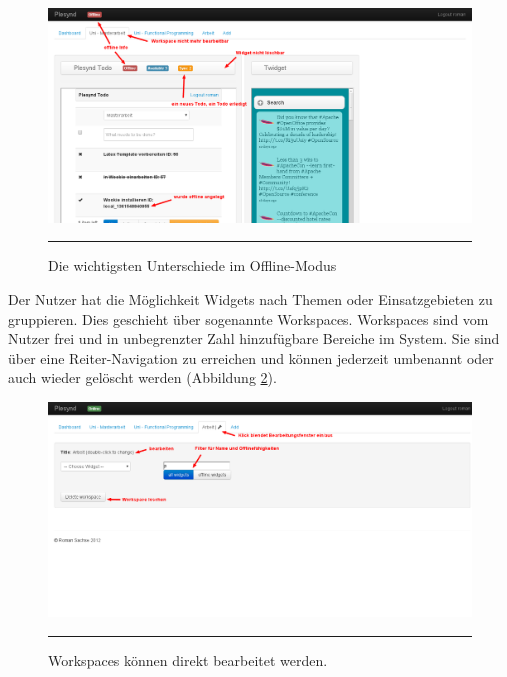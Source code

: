 \begin{figure}
  \centering
  \includegraphics[width=\textwidth,height=\textheight,keepaspectratio]{./Figures/plesynd_workspace_offline.png}
    \rule{35em}{0.5pt}
  \caption[Plesynd User-Interface: Workspace Offline]{Die wichtigsten Unterschiede im Offline-Modus}
  \label{fig:plesynd_workspace_offline}
\end{figure}
Der Nutzer hat die Möglichkeit Widgets nach Themen oder Einsatzgebieten zu gruppieren. Dies geschieht über sogenannte Workspaces. Workspaces sind vom Nutzer frei und in unbegrenzter Zahl hinzufügbare Bereiche im System. Sie sind über eine Reiter-Navigation zu erreichen und können jederzeit umbenannt oder auch wieder gelöscht werden (Abbildung \ref{fig:plesynd_workspace_edit}). 
\begin{figure}
  \centering
  \includegraphics[width=\textwidth,height=\textheight,keepaspectratio]{./Figures/plesynd_workspace_edit.png}
    \rule{35em}{0.5pt}
  \caption[Plesynd User-Interface: Bearbeiten von Workspaces]{Workspaces können direkt bearbeitet werden.}
  \label{fig:plesynd_workspace_edit}
\end{figure}

